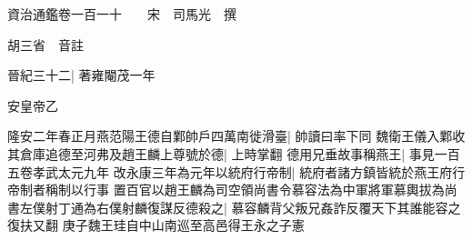 






























































資治通鑑卷一百一十　　宋　司馬光　撰

胡三省　音註

晉紀三十二|{
	著雍閹茂一年}


安皇帝乙

隆安二年春正月燕范陽王德自鄴帥戶四萬南徙滑臺|{
	帥讀曰率下同}
魏衛王儀入鄴收其倉庫追德至河弗及趙王麟上尊號於德|{
	上時掌翻}
德用兄垂故事稱燕王|{
	事見一百五卷孝武太元九年}
改永康三年為元年以統府行帝制|{
	統府者諸方鎮皆統於燕王府行帝制者稱制以行事}
置百官以趙王麟為司空領尚書令慕容法為中軍將軍慕輿拔為尚書左僕射丁通為右僕射麟復謀反德殺之|{
	慕容麟背父叛兄姦詐反覆天下其誰能容之復扶又翻}
庚子魏王珪自中山南巡至高邑得王永之子憲

